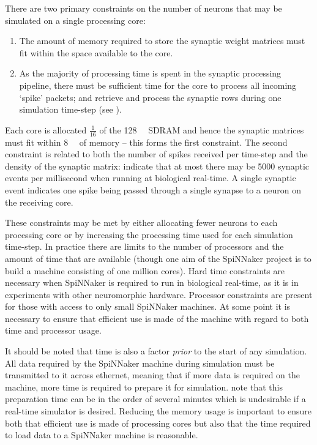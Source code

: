 \documentclass[conference]{IEEEtran}
\begin{document}
There are two primary constraints on the number of neurons that may be simulated on a single processing core:

  \begin{enumerate}
    \item The amount of memory required to store the synaptic weight matrices must fit within the space available to the core.
    \item As the majority of processing time is spent in the synaptic processing pipeline, there must be sufficient time for the core to process all incoming `spike' packets; and retrieve and process the synaptic rows during one simulation time-step (see \parencite{Sharp2013}).
  \end{enumerate}

Each core is allocated $\frac{1}{16}$ of the \SI{128}{\mebi\byte} SDRAM and hence the synaptic matrices must fit within \SI{8}{\mebi\byte} of memory -- this forms the first constraint.
The second constraint is related to both the number of spikes received per time-step and the density of the synaptic matrix: \textcite[\S III.C]{Sharp2013} indicate that at most there may be \num{5000} synaptic events per millisecond when running at biological real-time.
A single synaptic event indicates one spike being passed through a single synapse to a neuron on the receiving core.

These constraints may be met by either allocating fewer neurons to each processing core or by increasing the processing time used for each simulation time-step.
In practice there are limits to the number of processors and the amount of time that are available (though one aim of the SpiNNaker project is to build a machine consisting of one million cores).
Hard time constraints are necessary when SpiNNaker is required to run in biological real-time, as it is in experiments with other neuromorphic hardware.
Processor constraints are present for those with access to only small SpiNNaker machines.
At some point it is necessary to ensure that efficient use is made of the machine with regard to both time and processor usage.

It should be noted that time is also a factor \textit{prior} to the start of any simulation.
All data required by the SpiNNaker machine during simulation must be transmitted to it across ethernet, meaning that if more data is required on the machine, more time is required to prepare it for simulation.
\textcite{Sharp2013} note that this preparation time can be in the order of several minutes which is undesirable if a real-time simulator is desired.
Reducing the memory usage is important to ensure both that efficient use is made of processing cores but also that the time required to load data to a SpiNNaker machine is reasonable.
\end{document}
